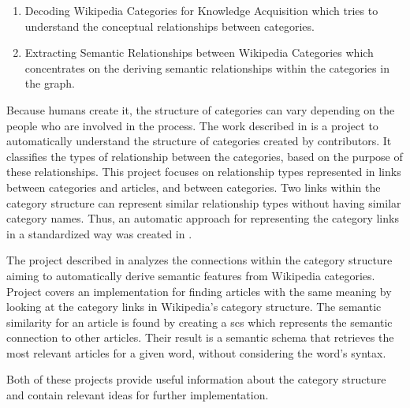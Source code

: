 \begin{enumerate}

\item Decoding Wikipedia Categories for Knowledge Acquisition \cite{nastase2008decoding} which tries to understand the conceptual relationships between categories.
\item Extracting Semantic Relationships between Wikipedia Categories \cite{chernov2006extracting} which concentrates on the deriving semantic relationships within the categories in the graph.

\end{enumerate}


Because humans create it, the structure of categories can vary depending on the people who are involved in the process. The work described in \cite{nastase2008decoding} is a project to automatically understand the structure of categories created by contributors. It classifies the types of relationship between the categories, based on the purpose of these relationships. This project focuses on relationship types represented in links between categories and articles, and between categories. Two links within the category structure can represent similar relationship types without having similar category names. Thus, an automatic approach for representing the category links in a standardized way
was created in \cite{nastase2008decoding} .

The project described in \cite{chernov2006extracting} analyzes the connections within the category structure aiming to automatically derive semantic features from Wikipedia categories. Project \cite{chernov2006extracting} covers an implementation for finding articles with the same meaning by looking at the category links in Wikipedia’s category structure. The semantic similarity for an article is found by creating a \gls{scs} which represents the semantic connection to other articles. Their result is a semantic schema that retrieves the most relevant articles for a given word, without considering the word’s syntax.

Both of these projects provide useful information about the category structure and contain relevant ideas for further implementation.



